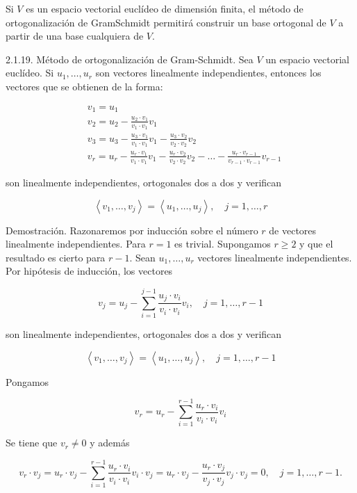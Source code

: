 \documentclass[12pt, a4paper, ones, notitlepage, openany,titlepage]{article}
\begin{document}
Si $V$ es un espacio vectorial euclídeo de dimensión finita, el método de ortogonalización de GramSchmidt permitirá construir un base ortogonal de $V$ a partir de una base cualquiera de $V$.

2.1.19. Método de ortogonalización de Gram-Schmidt. Sea $V$ un espacio vectorial euclídeo. Si $u_{1}, \ldots, u_{r}$ son vectores linealmente independientes, entonces los vectores que se obtienen de la forma:

$$
\begin{aligned}
	& v_{1}=u_{1} \\
	& v_{2}=u_{2}-\frac{u_{2} \cdot v_{1}}{v_{1} \cdot v_{1}} v_{1} \\
	& v_{3}=u_{3}-\frac{u_{3} \cdot v_{1}}{v_{1} \cdot v_{1}} v_{1}-\frac{u_{3} \cdot v_{2}}{v_{2} \cdot v_{2}} v_{2} \\
	& v_{r}=u_{r}-\frac{u_{r} \cdot v_{1}}{v_{1} \cdot v_{1}} v_{1}-\frac{u_{r} \cdot v_{2}}{v_{2} \cdot v_{2}} v_{2}-\ldots-\frac{u_{r} \cdot v_{r-1}}{v_{r-1} \cdot v_{r-1}} v_{r-1}
\end{aligned}
$$

son linealmente independientes, ortogonales dos a dos y verifican

$$
\left\langle v_{1}, \ldots, v_{j}\right\rangle=\left\langle u_{1}, \ldots, u_{j}\right\rangle, \quad j=1, \ldots, r
$$

Demostración. Razonaremos por inducción sobre el número $r$ de vectores linealmente independientes. Para $r=1$ es trivial. Supongamos $r \geq 2$ y que el resultado es cierto para $r-1$. Sean $u_{1}, \ldots, u_{r}$ vectores linealmente independientes. Por hipótesis de inducción, los vectores

$$
v_{j}=u_{j}-\sum_{i=1}^{j-1} \frac{u_{j} \cdot v_{i}}{v_{i} \cdot v_{i}} v_{i}, \quad j=1, \ldots, r-1
$$

son linealmente independientes, ortogonales dos a dos y verifican

$$
\left\langle v_{1}, \ldots, v_{j}\right\rangle=\left\langle u_{1}, \ldots, u_{j}\right\rangle, \quad j=1, \ldots, r-1
$$

Pongamos

$$
v_{r}=u_{r}-\sum_{i=1}^{r-1} \frac{u_{r} \cdot v_{i}}{v_{i} \cdot v_{i}} v_{i}
$$

Se tiene que $v_{r} \neq 0$ y además

$$
v_{r} \cdot v_{j}=u_{r} \cdot v_{j}-\sum_{i=1}^{r-1} \frac{u_{r} \cdot v_{i}}{v_{i} \cdot v_{i}} v_{i} \cdot v_{j}=u_{r} \cdot v_{j}-\frac{u_{r} \cdot v_{j}}{v_{j} \cdot v_{j}} v_{j} \cdot v_{j}=0, \quad j=1, \ldots, r-1 .
$$
\end{document}
